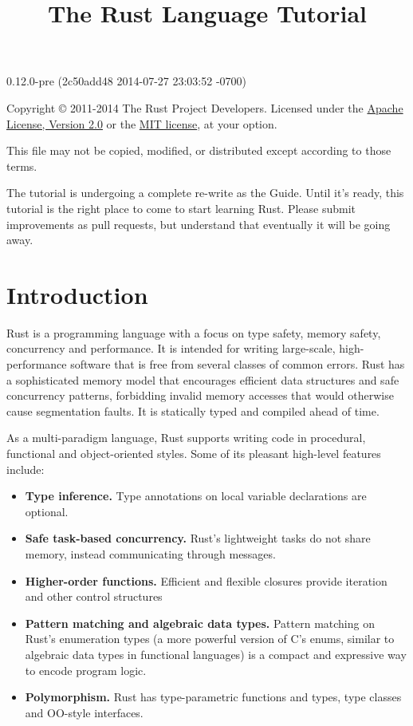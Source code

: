 \documentclass[]{article}
\title{The Rust Language Tutorial}
\begin{document}
\maketitle

0.12.0-pre (2c50add48 2014-07-27 23:03:52 -0700)

Copyright © 2011-2014 The Rust Project Developers. Licensed under the
\href{http://www.apache.org/licenses/LICENSE-2.0}{Apache License,
Version 2.0} or the \href{http://opensource.org/licenses/MIT}{MIT
license}, at your option.

This file may not be copied, modified, or distributed except according
to those terms.

{
\hypersetup{linkcolor=black}
\setcounter{tocdepth}{3}
\tableofcontents
}
The tutorial is undergoing a complete re-write as the Guide. Until it's
ready, this tutorial is the right place to come to start learning Rust.
Please submit improvements as pull requests, but understand that
eventually it will be going away.

\section{Introduction}\label{introduction}

Rust is a programming language with a focus on type safety, memory
safety, concurrency and performance. It is intended for writing
large-scale, high-performance software that is free from several classes
of common errors. Rust has a sophisticated memory model that encourages
efficient data structures and safe concurrency patterns, forbidding
invalid memory accesses that would otherwise cause segmentation faults.
It is statically typed and compiled ahead of time.

As a multi-paradigm language, Rust supports writing code in procedural,
functional and object-oriented styles. Some of its pleasant high-level
features include:

\begin{itemize}
\itemsep1pt\parskip0pt
\item
  \textbf{Type inference.} Type annotations on local variable
  declarations are optional.
\item
  \textbf{Safe task-based concurrency.} Rust's lightweight tasks do not
  share memory, instead communicating through messages.
\item
  \textbf{Higher-order functions.} Efficient and flexible closures
  provide iteration and other control structures
\item
  \textbf{Pattern matching and algebraic data types.} Pattern matching
  on Rust's enumeration types (a more powerful version of C's enums,
  similar to algebraic data types in functional languages) is a compact
  and expressive way to encode program logic.
\item
  \textbf{Polymorphism.} Rust has type-parametric functions and types,
  type classes and OO-style interfaces.
\end{itemize}
\end{document}
